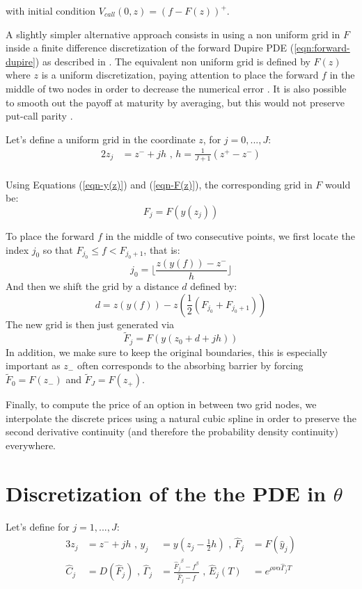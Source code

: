 \documentclass[]{rAMF2e}
\begin{document}
with initial condition $V_{call}(0, z) = (f - F(z))^+$.

A slightly simpler alternative approach consists in using a non uniform grid in $F$ inside a finite difference discretization of the forward Dupire PDE (\ref{eqn:forward-dupire}) as described in \citep{andersen2010interest}. The equivalent non uniform grid is defined by $F(z)$ where $z$ is a uniform discretization, paying attention to place the forward $f$ in the middle of two nodes in order to decrease the numerical error \citep{tavella-pricing}. It is also possible to smooth out the payoff at maturity by averaging, but this would not preserve put-call parity \citep{lefloch2013exacttr}.

Let's define a uniform grid in the coordinate $z$, for $j=0,...,J$:
\begin{alignat}{2}
z_j &= z^{-} + jh \text{ , } h = \frac{1}{J+1}(z^{+}-z^{-})\\
\end{alignat}

Using Equations (\ref{eqn-y(z)}) and (\ref{eqn-F(z)}), the corresponding grid in $F$ would be:
\begin{equation}
F_j = F(y(z_j))
\end{equation}

To place the forward $f$ in the middle of two consecutive points, we first locate the index $j_0$ so that 
$F_{j_0} \leq f < F_{j_0 + 1}$, that is:
\begin{equation}
j_0 = \lfloor\frac{z(y(f)) - z^{-}}{h}\rfloor
\end{equation}
And then we shift the grid by a distance $d$ defined by:
\begin{equation}
d = z(y(f))  - z\left(\frac{1}{2}(F_{j_0}+F_{j_0+1})\right)
\end{equation}
The new grid is then just generated via 
\begin{equation}
\tilde{F}_j = F(y(z_{0}+ d + j h))
\end{equation}
In addition, we make sure to keep the original boundaries, this is especially important as $z_{-}$ often corresponds to the absorbing barrier by forcing $\tilde{F}_0 = F(z_{-})$ and $\tilde{F}_J = F(z_{+})$.

Finally, to compute the price of an option in between two grid nodes, we interpolate the discrete prices using a natural cubic spline in order to preserve the second derivative continuity (and therefore the probability density continuity) everywhere.
 
\section{Discretization of the the PDE in $\theta$}
Let's define for $j=1,...,J$:
\begin{alignat}{3}
z_j &= z^{-} + jh \text{ , } \hat{y}_j&=y(z_j - \frac{1}{2}h) \text{ , } \hat{F}_j&=F(\hat{y}_j)\\
\hat{C}_j&=D(\hat{F}_j) \text{ , } \hat{\Gamma}_j &= \frac{{\hat{F}_j}^{\beta}-f^{\beta}}{\hat{F}_j-f} \text{ , } \hat{E}_j(T)&=e^{\rho\nu\alpha\hat{\Gamma}_j T}
\end{alignat}
\end{document}
